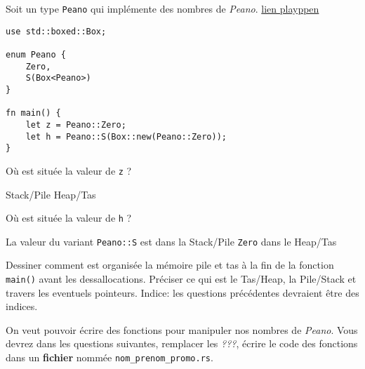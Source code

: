 \documentclass[11pt,a4paper,addpoint,answers]{exam}
\begin{document}
\begin{questions}
Soit un type \texttt{Peano} qui implémente des nombres de \emph{Peano}.
\href{https://play.rust-lang.org/?version=stable&mode=debug&edition=2018&code=use%20std%3A%3Aboxed%3A%3ABox%3B%0A%0Aenum%20Peano%20%7B%0A%20%20%20%20Zero%2C%0A%20%20%20%20S(Box%3CPeano%3E)%0A%7D%0A%0Afn%20main()%20%7B%0A%20%20%20%20let%20z%20%3D%20Peano%3A%3AZero%3B%0A%20%20%20%20let%20h%20%3D%20Peano%3A%3AS(Box%3A%3Anew(Peano%3A%3AZero))%3B%0A%7D}{lien playppen}
\begin{verbatim}
use std::boxed::Box;

enum Peano {
    Zero,
    S(Box<Peano>)
}

fn main() {
    let z = Peano::Zero;
    let h = Peano::S(Box::new(Peano::Zero));
}
\end{verbatim}

\question[1] Où est située la valeur de \texttt{z} ?
    \begin{checkboxes}
        \CorrectChoice Stack/Pile
        \choice Heap/Tas
   \end{checkboxes}

   \question[1] Où est située la valeur de \texttt{h} ?
    \begin{checkboxes}
        \CorrectChoice La valeur du variant \texttt{Peano::S} est dans la Stack/Pile
        \CorrectChoice \texttt{Zero} dans le Heap/Tas
   \end{checkboxes}

\question[1] Dessiner comment est organisée la mémoire pile et tas à la fin de la fonction \texttt{main()}
avant les dessallocations.
Préciser ce qui est le Tas/Heap, la Pile/Stack et travers les eventuels pointeurs. Indice: les questions précédentes devraient être des
indices.
\ifprintanswers
\begin{solution}
\end{solution}
\else
\vspace{2in}
\fi

On veut pouvoir écrire des fonctions pour manipuler nos nombres de \emph{Peano}.
Vous devrez dans les questions suivantes, remplacer les \emph{???}, écrire le code des fonctions dans un \textbf{fichier} nommée \texttt{nom\_prenom\_promo.rs}.


\end{questions}
\end{document}

